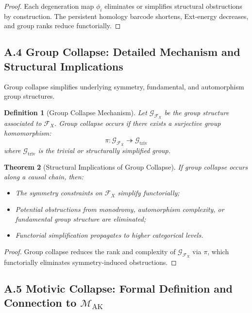 \documentclass[11pt]{article}
\newtheorem{theorem}{Theorem}[section]
\newtheorem{definition}[theorem]{Definition}
\begin{document}
\begin{proof}
Each degeneration map $\phi_i$ eliminates or simplifies structural obstructions by construction. The persistent homology barcode shortens, Ext-energy decreases, and group ranks reduce functorially.
\end{proof}

\subsection*{A.4 Group Collapse: Detailed Mechanism and Structural Implications}

Group collapse simplifies underlying symmetry, fundamental, and automorphism group structures.

\begin{definition}[Group Collapse Mechanism]
Let $\mathcal{G}_{\mathcal{F}_X}$ be the group structure associated to $\mathcal{F}_X$. Group collapse occurs if there exists a surjective group homomorphism:
\[
\pi: \mathcal{G}_{\mathcal{F}_X} \twoheadrightarrow \mathcal{G}_{\mathrm{triv}}
\]
where $\mathcal{G}_{\mathrm{triv}}$ is the trivial or structurally simplified group.
\end{definition}

\begin{theorem}[Structural Implications of Group Collapse]
If group collapse occurs along a causal chain, then:
\begin{itemize}
    \item The symmetry constraints on $\mathcal{F}_X$ simplify functorially;
    \item Potential obstructions from monodromy, automorphism complexity, or fundamental group structure are eliminated;
    \item Functorial simplification propagates to higher categorical levels.
\end{itemize}
\end{theorem}

\begin{proof}
Group collapse reduces the rank and complexity of $\mathcal{G}_{\mathcal{F}_X}$ via $\pi$, which functorially eliminates symmetry-induced obstructions.
\end{proof}

\subsection*{A.5 Motivic Collapse: Formal Definition and Connection to $\mathcal{M}_{\mathrm{AK}}$}
\end{document}
